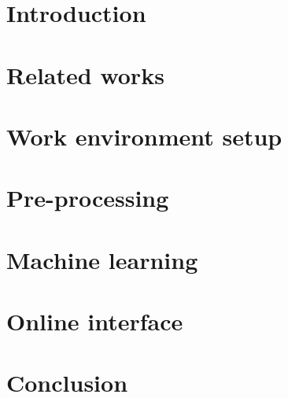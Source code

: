


\setcounter{page}{1}
\setcounter{secnumdepth}{2}
\setcounter{tocdepth}{2}
\tableofcontents
\chapter{Introduction}

\chapter{Related works} \label{related_works}

\chapter{Work environment setup} \label{methods}




\chapter{Pre-processing} \label{preprocessing}


\chapter{Machine learning} \label{machine_learning}





%
\chapter{Online interface}
 \label{online_tool}
\chapter{Conclusion}
 \label{conclusion}

\printbibliography